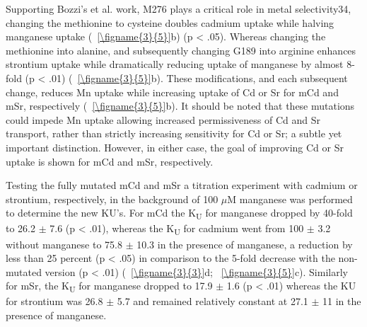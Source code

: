 \documentclass[../main/main]{subfiles}
\begin{document}
Supporting Bozzi's et al. work, M276 plays a critical role in metal selectivity34, changing the methionine to cysteine doubles cadmium uptake while halving manganese uptake (\FIGURE~\ref{\figname{3}{5}}b) (p < .05). Whereas changing the methionine into alanine, and subsequently changing G189 into arginine enhances strontium uptake while dramatically reducing uptake of manganese by almost 8-fold (p < .01) (\FIGURE~\ref{\figname{3}{5}}b). These modifications, and each subsequent change, reduces Mn uptake while increasing uptake of Cd or Sr for mCd and mSr, respectively (\FIGURE~\ref{\figname{3}{5}}b). It should be noted that these mutations could impede Mn uptake allowing increased permissiveness of Cd and Sr transport, rather than strictly increasing sensitivity for Cd or Sr; a subtle yet important distinction. However, in either case, the goal of improving Cd or Sr uptake is shown for mCd and mSr, respectively.

Testing the fully mutated mCd and mSr a titration experiment with cadmium or strontium, respectively, in the background of 100 $\mu$M manganese was performed to determine the new KU's. For mCd the K\textsubscript{U} for manganese dropped by 40-fold to 26.2 $\pm$ 7.6 (p < .01), whereas the K\textsubscript{U} for cadmium went from 100 $\pm$ 3.2 without manganese to 75.8 $\pm$ 10.3 in the presence of manganese, a reduction by less than 25 percent (p < .05) in comparison to the 5-fold decrease with the non-mutated version (p < .01) (\FIGURE~\ref{\figname{3}{3}}d; \FIGURE~\ref{\figname{3}{5}}c). Similarly for mSr, the K\textsubscript{U} for manganese dropped to 17.9 $\pm$ 1.6 (p < .01) whereas the KU for strontium was 26.8 $\pm$ 5.7 and remained relatively constant at 27.1 $\pm$ 11 in the presence of manganese.
\clearpage %
\end{document}
